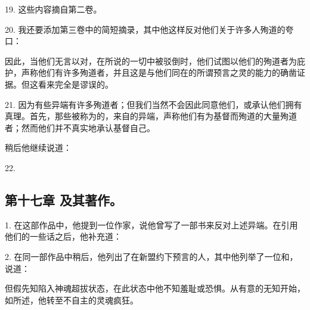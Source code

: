 19. 这些内容摘自第二卷。\par

20. 我还要添加第三卷中的简短摘录，其中他这样反对他们关于许多人殉道的夸口：\par

因此，当他们无言以对，在所说的一切中被驳倒时，他们试图以他们的殉道者为庇护，声称他们有许多殉道者，并且这是与他们同在的所谓预言之灵的能力的确凿证据。但这看来完全是谬误的。\par

21. 因为有些异端有许多殉道者；但我们当然不会因此同意他们，或承认他们拥有真理。首先，那些被称为的，来自的异端，声称他们有为基督而殉道的大量殉道者；然而他们并不真实地承认基督自己。\par

稍后他继续说道：\par

22. \par


\subsection{第十七章 及其著作。}

1. 在这部作品中，他提到一位作家，说他曾写了一部书来反对上述异端。在引用他们的一些话之后，他补充道：\par

\par

2. 在同一部作品中稍后，他列出了在新盟约下预言的人，其中他列举了一位和，说道：\par

但假先知陷入神魂超拔状态，在此状态中他不知羞耻或恐惧。从有意的无知开始，如所述，他转至不自主的灵魂疯狂。\par

